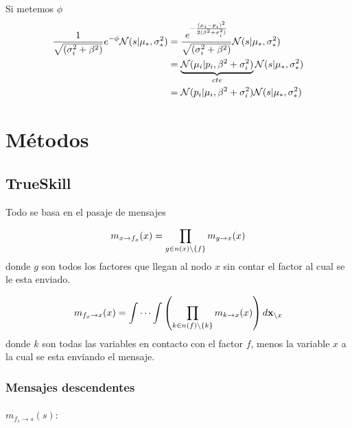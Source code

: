 \documentclass[11pt,twoside,spanish]{report} %
\begin{document}
Si metemos $\phi$
\begin{equation}
	\centering
	\begin{split}
		\frac{1}{\sqrt{(\sigma_i^2+\beta^2)}}e^{-\phi}\mathcal{N}(s \vert\mu_{\ast},\sigma_{\ast}^2)
		& =\frac{e^{-\frac{(\mu_i-p_i)^2}{2(\beta^2+\sigma_i^2)}}}{\sqrt{(\sigma_i^2+\beta^2)}}\mathcal{N}(s \vert\mu_{\ast},\sigma_{\ast}^2)\\
		& = \underbrace{\mathcal{N}(\mu_i\vert p_i,\beta^2+\sigma_i^2)}_{cte}\mathcal{N}(s \vert\mu_{\ast},\sigma_{\ast}^2)\\
		& = \mathcal{N}(p_i\vert \mu_i,\beta^2+\sigma_i^2)\mathcal{N}(s \vert\mu_{\ast},\sigma_{\ast}^2)
	\end{split}
\end{equation}











\chapter{M\'etodos}
\section{TrueSkill}


Todo se basa en el pasaje de mensajes

\begin{equation}
	\centering
	m_{x\rightarrow f_{x}}(x) = \prod_{g\in n(x)\backslash\{f\}}m_{g\rightarrow x}(x)
\end{equation}
donde $g$ son todos los factores que llegan al nodo $x$ sin contar el factor al cual se le esta enviado.

\begin{equation}
	\centering
	m_{f_{x}\rightarrow x}(x) = \int\cdots\int\left(\prod_{k\in n(f)\backslash\{k\}}m_{k\rightarrow x}(x)\right)d\textbf{x}_{\backslash x}
\end{equation}
donde $k$ son todas las variables en contacto con el factor $f$, menos la variable $x$ a la cual se esta enviando el mensaje.

\subsection{Mensajes descendentes}
\label{appendix:mensajes}
\paragraph{$m_{f_{s}\rightarrow s}(s):$}
\end{document}
